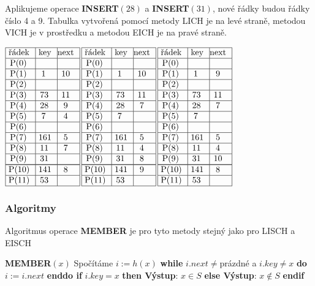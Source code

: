 \documentclass[a4paper,12pt]{article}
\newcommand{\algoritmus}[1]{
  {
  \setlength\fboxrule{0.5pt}

  \begin{boxedminipage}{0.8\textwidth}

 #1
  \end{boxedminipage}

  }
  }
\begin{document}
Aplikujeme operace {\bf INSERT$(28)$} a {\bf INSERT$(31
)$}, nové řád\-ky 
budou řádky číslo 4 a 9. Tabulka vytvořená pomocí 
metody LICH je na levé straně, metodou VICH je v 
prostředku a metodou EICH je na pravé straně.

$\vbox {\hbox{\vtop{\offinterlineskip\halign{\strut\vrule\ # & \vrule\ # & \vrule\hfil # \hfil\vrule\cr\noalign{\hrule}řádek & key & next \hfil\cr\noalign{\hrule}P(0) & &\hfill \cr\noalign{\hrule}P(1) & 1 & 10 \cr\noalign{\hrule}P(2) & &\hfill \cr\noalign{\hrule}P(3) & 73 & 11 \cr\noalign{\hrule}P(4) & 28 & 9 \cr\noalign{\hrule}P(5) & 7 & 4 \cr\noalign{\hrule}P(6) &  &\hfill \cr\noalign{\hrule}P(7) & 161 & 5 \cr\noalign{\hrule}P(8) & 11 & 7 \cr\noalign{\hrule}P(9) & 31 &\hfill \cr\noalign{\hrule}\noalign{\hrule}P(10) & 141 & 8 \cr\noalign{\hrule}P(11) & 53 & \hfill \cr\noalign{\hrule}}}\,\vtop{\offinterlineskip\halign{\strut\vrule\ # & \vrule\ # & \vrule\hfil# \hfil\vrule\cr\noalign{\hrule}řádek & key & next \hfil\cr\noalign{\hrule}P(0) & &\hfill \cr\noalign{\hrule}P(1) & 1 & 10 \cr\noalign{\hrule}P(2) & &\hfill \cr\noalign{\hrule}P(3) & 73 & 11 \cr\noalign{\hrule}P(4) & 28 & 7 \cr\noalign{\hrule}P(5) & 7 & \hfill \cr\noalign{\hrule}P(6) &  &\hfill \cr\noalign{\hrule}P(7) & 161 & 5 \cr\noalign{\hrule}P(8) & 11 & 4 \cr\noalign{\hrule}P(9) & 31 & 8 \cr\noalign{\hrule}\noalign{\hrule}P(10) & 141 & 9 \cr\noalign{\hrule}P(11) & 53 & \hfill \cr\noalign{\hrule}}}\,\vtop{\offinterlineskip\halign {\strut\vrule\ # & \vrule\ # & \vrule \hfil # \hfil \vrule\cr\noalign{\hrule}řádek & key & next \hfil \cr\noalign{\hrule}P(0) & &\hfill \cr\noalign{\hrule}P(1) & 1 & 9 \cr\noalign{\hrule}P(2) & &\hfill \cr\noalign{\hrule}P(3) & 73 & 11 \cr\noalign{\hrule}P(4) & 28 & 7 \cr\noalign{\hrule}P(5) & 7 & \hfill \cr\noalign{\hrule}P(6) & & \hfill \cr\noalign{\hrule}P(7) & 161 & 5 \cr\noalign{\hrule}P(8) & 11 & 4  \cr\noalign{\hrule}P(9) & 31 & 10 \cr\noalign{\hrule}\noalign{\hrule}P(10) & 141 & 8 \cr\noalign{\hrule}P(11) & 53 & \hfill \cr\noalign{\hrule}}}}}$

\subsubsection{Algoritmy}

Algoritmus operace {\bf MEMBER} je pro tyto metody 
stejný jako pro LISCH a EISCH

\algoritmus{
{\bf MEMBER$(x)$}\newline 
Spočítáme $i:=h(x)$\newline 
{\bf \textsf{while}} $i.next\ne$prázdné a $i.key\ne x$ {\bf \textsf{do}} $i:=i.
next$ {\bf \textsf{enddo}\newline 
\textsf{if}} $i.key=x$ {\bf \textsf{then} Výstup}: $x\in S$ {\bf \textsf{else} Výstup}: $
x\notin S$ {\bf \textsf{endif}
}
}
\end{document}
